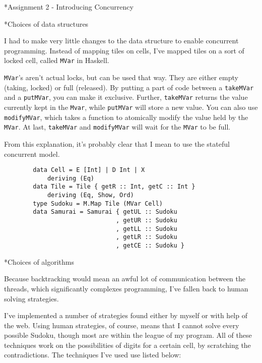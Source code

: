 \documentclass[a4paper,12pt]{article}
\begin{document}
\begin{section}*{Assignment 2 - Introducing Concurrency}


    \begin{subsection}*{Choices of data structures}

        I had to make very little changes to the data structure to enable
        concurrent programming. Instead of mapping tiles on cells, I've mapped
        tiles on a sort of locked cell, called \texttt{MVar} in Haskell.

        \texttt{MVar}'s aren't actual locks, but can be used that way. They are
        either empty (taking, locked) or full (released). By putting a part of
        code between a \texttt{takeMVar} and a \texttt{putMVar}, you can make it
        exclusive. Further, \texttt{takeMVar} returns the value currently kept
        in the \texttt{Mvar}, while \texttt{putMVar} will store a new value. You
        can also use \texttt{modifyMVar}, which takes a function to atomically
        modify the value held by the \texttt{MVar}. At last, \texttt{takeMVar}
        and \texttt{modifyMVar} will wait for the \texttt{MVar} to be full.

        From this explanation, it's probably clear that I mean to use the
        stateful concurrent model.

        \begin{lstlisting}
        data Cell = E [Int] | D Int | X
            deriving (Eq)
        data Tile = Tile { getR :: Int, getC :: Int }
            deriving (Eq, Show, Ord)
        type Sudoku = M.Map Tile (MVar Cell)
        data Samurai = Samurai { getUL :: Sudoku
                               , getUR :: Sudoku
                               , getLL :: Sudoku
                               , getLR :: Sudoku
                               , getCE :: Sudoku }
        \end{lstlisting}

    \end{subsection}


    \begin{subsection}*{Choices of algorithms}

        Because backtracking would mean an awful lot of communication between
        the threads, which significantly complexes programming, I've fallen
        back to human solving strategies.

        I've implemented a number of strategies found either by myself or with
        help of the web. Using human strategies, of course, means that I cannot
        solve every possible Sudoku, though most are within the league of my
        program. All of these techniques work on the possibilities of digits for
        a certain cell, by scratching the contradictions. The techniques I've
        used use listed below:


\end{subsection}
\end{section}
\end{document}
